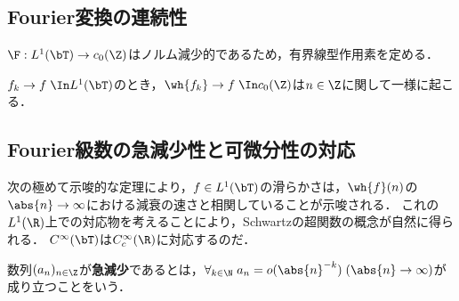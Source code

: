 \documentclass[uplatex,dvipdfmx]{jsreport}
\begin{document}
\subsection{Fourier変換の連続性}

\begin{tcolorbox}[colframe=ForestGreen, colback=ForestGreen!10!white,breakable,colbacktitle=ForestGreen!40!white,coltitle=black,fonttitle=\bfseries\sffamily,
title=]
    $\F:L^1(\bT)\to c_0(\Z)$はノルム減少的であるため，有界線型作用素を定める．
\end{tcolorbox}

\begin{proposition}
    $f_k\to f\;\In L^1(\bT)$のとき，$\wh{f_k}\to f\;\In c_0(\Z)$は$n\in\Z$に関して一様に起こる．
\end{proposition}

\subsection{Fourier級数の急減少性と可微分性の対応}

\begin{tcolorbox}[colframe=ForestGreen, colback=ForestGreen!10!white,breakable,colbacktitle=ForestGreen!40!white,coltitle=black,fonttitle=\bfseries\sffamily,
title=]
    次の極めて示唆的な定理により，$f\in L^1(\bT)$の滑らかさは，$\wh{f}(n)$の$\abs{n}\to\infty$における減衰の速さと相関していることが示唆される．
    これの$L^1(\R)$上での対応物を考えることにより，Schwartzの超関数の概念が自然に得られる．
    $C^\infty(\bT)$は$C_c^\infty(\R)$に対応するのだ．
\end{tcolorbox}

\begin{definition}
    数列$(a_n)_{n\in\Z}$が\textbf{急減少}であるとは，$\forall_{k\in\N}\;a_n=o(\abs{n}^{-k})\;(\abs{n}\to\infty)$が成り立つことをいう．
\end{definition}
\end{document}
